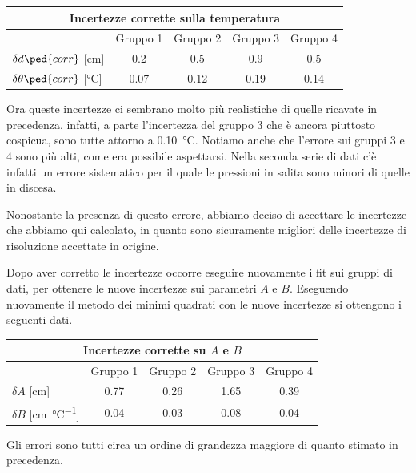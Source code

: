 \begin{center}
    \begin{tabular}{l c c c c}
        \multicolumn{5}{c}{\textbf{Incertezze corrette sulla temperatura}} \\
        \toprule
        & Gruppo 1 & Gruppo 2 & Gruppo 3 & Gruppo 4 \\
        \midrule
        $\delta d\ped{corr}$ [cm] & 0.2 & 0.5 & 0.9 & 0.5 \\
        $\delta \theta\ped{corr}$ [\si{\celsius}] & 0.07 & 0.12 & 0.19 & 0.14 \\
        \bottomrule
    \end{tabular}
\end{center}

Ora queste incertezze ci sembrano molto più realistiche di quelle ricavate in precedenza, infatti, a parte l'incertezza del 
gruppo 3 che è ancora piuttosto cospicua, sono tutte attorno a \SI{0.10}{\celsius}. Notiamo anche che
l'errore sui gruppi 3 e 4 sono più alti, come era possibile aspettarsi.
Nella seconda serie di dati c'è infatti un errore sistematico per il quale le pressioni in salita sono minori di quelle in discesa.

Nonostante la presenza di questo errore, abbiamo deciso di accettare le incertezze che abbiamo qui calcolato, in quanto
sono sicuramente migliori delle incertezze di risoluzione accettate in origine.

Dopo aver corretto le incertezze occorre eseguire nuovamente i fit sui gruppi di dati, per ottenere le nuove incertezze sui parametri
$A$ e $B$. Eseguendo nuovamente il metodo dei minimi quadrati con le nuove incertezze si ottengono i seguenti dati.

\begin{center}
    \begin{tabular}{l c c c c}
        \multicolumn{5}{c}{\textbf{Incertezze corrette su $A$ e $B$}} \\
        \toprule
        & Gruppo 1 & Gruppo 2 & Gruppo 3 & Gruppo 4 \\
        \midrule
        $\delta A$ [cm] & 0.77 & 0.26 & 1.65 & 0.39 \\
        $\delta B$ [\si{\centi\metre\per\celsius}] & 0.04 & 0.03 & 0.08 & 0.04 \\
        \bottomrule
    \end{tabular}
\end{center}

Gli errori sono tutti circa un ordine di grandezza maggiore di quanto stimato in precedenza.

